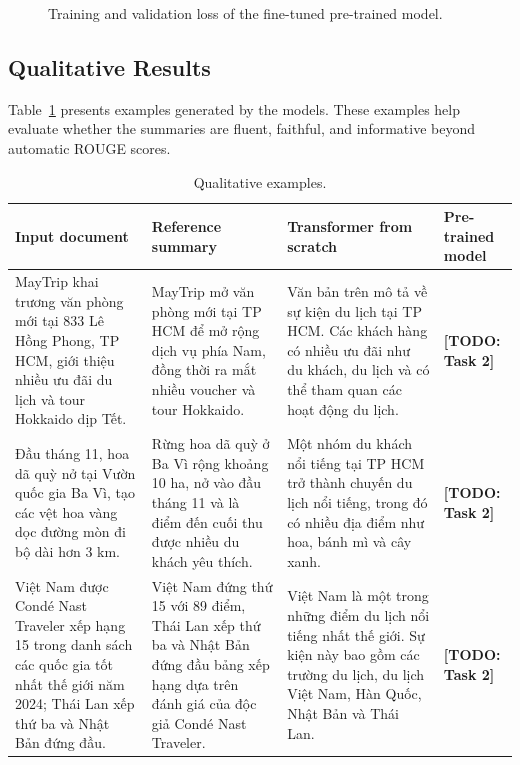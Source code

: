 \documentclass[conference]{IEEEtran}
\begin{document}
\begin{figure}[htbp]
\centering
{}
\caption{Training and validation loss of the fine-tuned pre-trained model.}
\label{fig:loss_pretrained}
\end{figure}

\subsection{Qualitative Results}
Table~\ref{tab:qualitative} presents examples generated by the models. These examples help evaluate whether the summaries are fluent, faithful, and informative beyond automatic ROUGE scores.

\begin{table}[htbp]
\centering
\caption{Qualitative examples.}
\label{tab:qualitative}
\begin{tabular}{p{}p{}p{}p{}}
\toprule
Input document & Reference summary & Transformer from scratch & Pre-trained model \\
\midrule
MayTrip khai trương văn phòng mới tại 833 Lê Hồng Phong, TP HCM, giới thiệu nhiều ưu đãi du lịch và tour Hokkaido dịp Tết. & MayTrip mở văn phòng mới tại TP HCM để mở rộng dịch vụ phía Nam, đồng thời ra mắt nhiều voucher và tour Hokkaido. & Văn bản trên mô tả về sự kiện du lịch tại TP HCM. Các khách hàng có nhiều ưu đãi như du khách, du lịch và có thể tham quan các hoạt động du lịch. & \textbf{[TODO: Task 2]} \\
\midrule
Đầu tháng 11, hoa dã quỳ nở tại Vườn quốc gia Ba Vì, tạo các vệt hoa vàng dọc đường mòn đi bộ dài hơn 3 km. & Rừng hoa dã quỳ ở Ba Vì rộng khoảng 10 ha, nở vào đầu tháng 11 và là điểm đến cuối thu được nhiều du khách yêu thích. & Một nhóm du khách nổi tiếng tại TP HCM trở thành chuyến du lịch nổi tiếng, trong đó có nhiều địa điểm như hoa, bánh mì và cây xanh. & \textbf{[TODO: Task 2]} \\
\midrule
Việt Nam được Condé Nast Traveler xếp hạng 15 trong danh sách các quốc gia tốt nhất thế giới năm 2024; Thái Lan xếp thứ ba và Nhật Bản đứng đầu. & Việt Nam đứng thứ 15 với 89 điểm, Thái Lan xếp thứ ba và Nhật Bản đứng đầu bảng xếp hạng dựa trên đánh giá của độc giả Condé Nast Traveler. & Việt Nam là một trong những điểm du lịch nổi tiếng nhất thế giới. Sự kiện này bao gồm các trường du lịch, du lịch Việt Nam, Hàn Quốc, Nhật Bản và Thái Lan. & \textbf{[TODO: Task 2]} \\
\bottomrule
\end{tabular}
\end{table}
\end{document}
